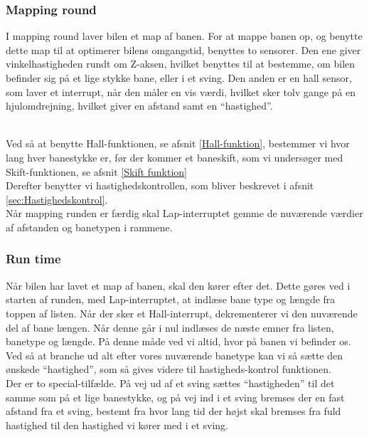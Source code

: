 \subsubsection{Mapping round}
I mapping round laver bilen et map af banen. For at mappe banen op, og benytte dette map til at optimerer bilens omgangstid, benyttes to sensorer. Den ene giver vinkelhastigheden rundt om Z-aksen, hvilket benyttes til at bestemme, om bilen befinder sig på et lige stykke bane, eller i et sving. Den anden er en hall sensor, som laver et interrupt, når den måler en vis værdi, hvilket sker tolv gange på en hjulomdrejning, hvilket giver en afstand samt en ``hastighed''. 
\\\

Ved så at benytte Hall-funktionen, se afsnit \ref{Hall-funktion}, bestemmer vi hvor lang hver banestykke er, før der kommer et baneskift, som vi undersøger med Skift-funktionen, se afsnit \ref{Skift funktion}
\\
Derefter benytter vi hastighedskontrollen, som bliver beskrevet i afsnit \ref{sec:Hastighedskontrol}.
\\
Når mapping runden er færdig skal Lap-interruptet gemme de nuværende værdier af afstanden og banetypen i rammene. 

\subsubsection{Run time}

Når bilen har lavet et map af banen, skal den kører efter det. Dette gøres ved i starten af runden, med Lap-interruptet, at indlæse bane type og længde fra toppen af listen. Når der sker et Hall-interrupt, dekrementerer vi den nuværende del af bane længen. Når denne går i nul indlæses de næste emner fra listen, banetype og længde. På denne måde ved vi altid, hvor på banen vi befinder os.
\\
Ved så at branche ud alt efter vores nuværende banetype kan vi så sætte den ønskede ``hastighed'', som så gives videre til hastigheds-kontrol funktionen.
\\
Der er to special-tilfælde. På vej ud af et sving sættes ``hastigheden'' til det samme som på et lige banestykke, og på vej ind i et sving bremses der en fast afstand fra et sving, bestemt fra hvor lang tid der højst skal bremses fra fuld hastighed til den hastighed vi kører med i et sving.
